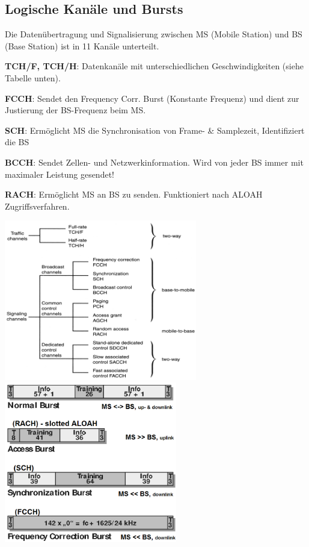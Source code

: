 \subsection{Logische Kanäle und Bursts}
    Die Datenübertragung und Signalisierung zwischen MS (Mobile Station) und BS (Base Station) ist in 11 Kanäle 
    unterteilt.
    \begin{liste}
        \item \textbf{TCH/F, TCH/H}: Datenkanäle mit unterschiedlichen Geschwindigkeiten (siehe Tabelle unten).
        \item \textbf{FCCH}: Sendet den  Frequency Corr. Burst (Konstante Frequenz) und dient zur Justierung der BS-Frequenz beim MS.
        \item \textbf{SCH}: Ermöglicht MS die Synchronisation von Frame- \& Samplezeit, Identifiziert die BS
        \item \textbf{BCCH}: Sendet Zellen- und Netzwerkinformation. Wird von jeder BS immer mit maximaler Leistung gesendet!
        \item \textbf{RACH}: Ermöglicht MS an BS zu senden. Funktioniert nach ALOAH Zugriffsverfahren.
    \end{liste}

    \begin{center}    
        \includegraphics[height=7cm]{./bilder/systems-gsm-logicalCH.png}
	    \hspace{1cm}
        \includegraphics[height=7cm]{./bilder/systems-gsm-bursts.png}
    \end{center}

